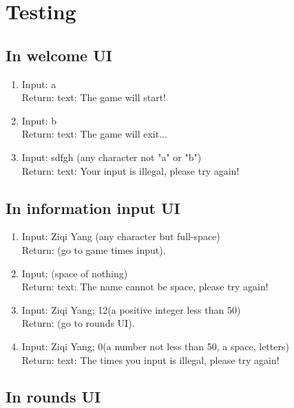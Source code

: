 \documentclass[12pt]{article}
\begin{document}
	\section{Testing}
	
	\subsection{In welcome UI}
		
		\begin{enumerate}[$\bullet$]
			\item Input: a\\
			Return: text: The game will start!
			\item Input: b\\
			Return: text: The game will exit...
			\item Input: sdfgh (any character not "a" or "b")\\
			Return: text: Your input is illegal, please try again!
		\end{enumerate}
	
	\subsection{In information input UI}
		
		\begin{enumerate}[$\bullet$]
			\item Input: Ziqi Yang (any character but full-space)\\
			Return: (go to game times input).
			\item Input: (space of nothing)\\
			Return: text: The name cannot be space, please try again!
			\item Input: Ziqi Yang; 12(a positive integer less than 50)\\
			Return: (go to rounds UI).
			\item Input: Ziqi Yang; 0(a number not less than 50, a space, letters)\\
			Return: text: The times you input is illegal, please try again!
		\end{enumerate}
	
	\subsection{In rounds UI}
\end{document}
